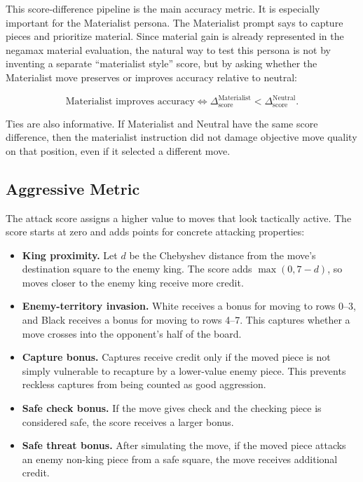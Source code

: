 \documentclass[10pt]{article}
\begin{document}
This score-difference pipeline is the main accuracy metric. It is especially important for the Materialist persona. The Materialist prompt says to capture pieces and prioritize material. Since material gain is already represented in the negamax material evaluation, the natural way to test this persona is not by inventing a separate ``materialist style'' score, but by asking whether the Materialist move preserves or improves accuracy relative to neutral:

\[
\text{Materialist improves accuracy} \iff
\Delta_{\text{score}}^{\text{Materialist}} <
\Delta_{\text{score}}^{\text{Neutral}}.
\]

Ties are also informative. If Materialist and Neutral have the same score difference, then the materialist instruction did not damage objective move quality on that position, even if it selected a different move.

\subsection{Aggressive Metric}

The attack score assigns a higher value to moves that look tactically active. The score starts at zero and adds points for concrete attacking properties:

\begin{itemize}
    \item \textbf{King proximity.} Let $d$ be the Chebyshev distance from the move's destination square to the enemy king. The score adds $\max(0, 7-d)$, so moves closer to the enemy king receive more credit.
    \item \textbf{Enemy-territory invasion.} White receives a bonus for moving to rows 0--3, and Black receives a bonus for moving to rows 4--7. This captures whether a move crosses into the opponent's half of the board.
    \item \textbf{Capture bonus.} Captures receive credit only if the moved piece is not simply vulnerable to recapture by a lower-value enemy piece. This prevents reckless captures from being counted as good aggression.
    \item \textbf{Safe check bonus.} If the move gives check and the checking piece is considered safe, the score receives a larger bonus.
    \item \textbf{Safe threat bonus.} After simulating the move, if the moved piece attacks an enemy non-king piece from a safe square, the move receives additional credit.
\end{itemize}
\end{document}
